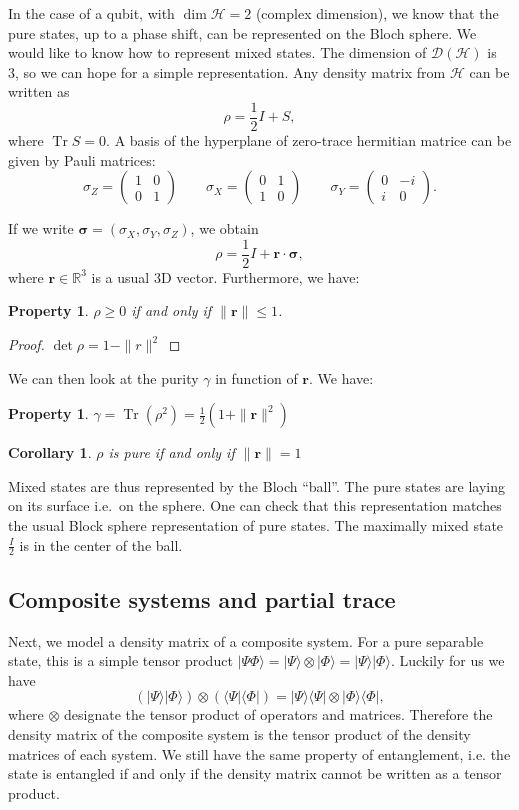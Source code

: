 \documentclass[10pt,a4paper]{report}
\theoremstyle{plain}
\newtheorem{prop}[thm]{Property}
\newtheorem{cor}{Corollary}[thm]
\theoremstyle{definition}
\theoremstyle{remark}
\newcommand{\R}{\ensuremath{\mathbb{R}}}
\newcommand{\ket}[1]{|#1\rangle}
\newcommand{\bra}[1]{\langle#1|}
\renewcommand{\geq}{\geqslant}
\renewcommand{\leq}{\leqslant}
\newcommand{\mat}[1]{\begin{pmatrix}#1\end{pmatrix}}
\newcommand{\bs}{\boldsymbol}
\DeclareMathOperator{\Tr}{Tr}
\begin{document}
In the case of a qubit, with $\dim \mathcal{H} = 2$ (complex dimension), we know
that the pure states, up to a phase shift, can be represented on the Bloch sphere. We
would like to know how to represent mixed states. The dimension of
$\mathcal{D}(\mathcal{H})$ is 3, so we can hope for a simple representation. Any
density matrix from $\mathcal{H}$ can be written as
\[\rho = \frac12I + S,\]
where $\Tr S = 0$. A basis of the hyperplane of zero-trace hermitian matrice can
be given by Pauli matrices:
\[\sigma_Z = \mat{1&0\\0&1} \quad \quad \sigma_X = \mat{0&1\\1&0} \quad \quad
  \sigma_Y = \mat{0&-i\\i&0}.\]

If we write $\bs\sigma = (\sigma_X,\sigma_Y,\sigma_Z)$, we obtain
\[\rho = \frac12 I + \bs r \cdot \bs \sigma,\]
where $\bs r \in \R^3$ is a usual 3D vector. Furthermore, we have:

\begin{prop}
  $\rho \geq 0$ if and only if $\|\bs r\| \leq 1$.
\end{prop}

\begin{proof}
  $\det \rho = 1 - \|r\|^2$
\end{proof}

We can then look at the purity $\gamma$ in function of $\bs r$. We have:

\begin{prop}
  $\gamma = \Tr(\rho^2) = \frac 12 (1 + \|\bs r\|^2)$
\end{prop}

\begin{cor}
  $\rho$ is pure if and only if $\|\bs r\| = 1$
\end{cor}

Mixed states are thus represented by the Bloch ``ball''. The pure states are laying on its surface i.e.\ on the sphere. One can check that this representation matches the usual Block sphere representation of pure states. The
maximally mixed state $\frac I2$ is in the center of the ball.

\subsection{Composite systems and partial trace}

Next, we model a density matrix of a composite system. For a pure separable state,
this is a simple tensor product $\ket{\Psi\Phi} = \ket \Psi \otimes \ket \Phi =
\ket \Psi\ket\Phi$. Luckily for us we have
\[(\ket\Psi\ket\Phi) \otimes (\bra\Psi\bra\Phi) = \ket\Psi\bra\Psi \otimes \ket
  \Phi \bra \Phi,\]
where $\otimes$ designate the tensor product of operators and matrices. Therefore
the density matrix of the composite system is the tensor product of the density
matrices of each system.
We still have the same property of entanglement, i.e. the state is entangled if
and only if
the density matrix cannot be written as a tensor product.
\end{document}
